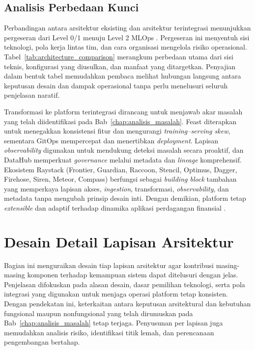 \subsection{Analisis Perbedaan Kunci}

Perbandingan antara arsitektur eksisting dan arsitektur terintegrasi menunjukkan pergeseran dari Level 0/1 menuju Level 2 MLOps \textcite{kreuzberger2023mlops}. Pergeseran ini menyentuh sisi teknologi, pola kerja lintas tim, dan cara organisasi mengelola risiko operasional. Tabel~\ref{tab:architecture_comparison} merangkum perbedaan utama dari sisi teknis, konfigurasi yang diusulkan, dan manfaat yang ditargetkan. Penyajian dalam bentuk tabel memudahkan pembaca melihat hubungan langsung antara keputusan desain dan dampak operasional tanpa perlu menelusuri seluruh penjelasan naratif.



\vspace{-0.5cm}

Transformasi ke platform terintegrasi dirancang untuk menjawab akar masalah yang telah diidentifikasi pada Bab~\ref{chap:analisis_masalah}. Feast diterapkan untuk menegakkan konsistensi fitur dan mengurangi \textit{training--serving skew}, sementara GitOps mempercepat dan menertibkan \textit{deployment}. Lapisan \textit{observability} digunakan untuk mendukung deteksi masalah secara proaktif, dan DataHub memperkuat \textit{governance} melalui metadata dan \textit{lineage} komprehensif. Ekosistem Raystack (Frontier, Guardian, Raccoon, Stencil, Optimus, Dagger, Firehose, Siren, Meteor, Compass) berfungsi sebagai \textit{building block} tambahan yang memperkaya lapisan akses, \textit{ingestion}, transformasi, \textit{observability}, dan metadata tanpa mengubah prinsip desain inti. Dengan demikian, platform tetap \textit{extensible} dan adaptif terhadap dinamika aplikasi perdagangan finansial \autocite{burgueno2025toward}.

\section{Desain Detail Lapisan Arsitektur}

Bagian ini menguraikan desain tiap lapisan arsitektur agar kontribusi masing-masing komponen terhadap kemampuan sistem dapat ditelusuri dengan jelas. Penjelasan difokuskan pada alasan desain, dasar pemilihan teknologi, serta pola integrasi yang digunakan untuk menjaga operasi platform tetap konsisten. Dengan pendekatan ini, keterkaitan antara keputusan arsitektural dan kebutuhan fungsional maupun nonfungsional yang telah dirumuskan pada Bab~\ref{chap:analisis_masalah} tetap terjaga. Penyusunan per lapisan juga memudahkan analisis risiko, identifikasi titik lemah, dan perencanaan pengembangan bertahap.

